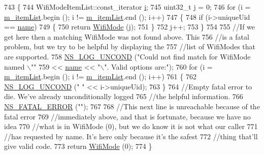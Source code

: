 \begin{DoxyCode}
743 \{
744   WifiModeItemList::const\_iterator \hyperlink{bernuolliDistribution_8m_a6f6ccfcf58b31cb6412107d9d5281426}{i};
745   uint32\_t j = 0;
746   \textcolor{keywordflow}{for} (i = \hyperlink{classns3_1_1WifiModeFactory_aa8fc74e45dbb82fc08d4d5eb967266e6}{m\_itemList}.begin (); i != \hyperlink{classns3_1_1WifiModeFactory_aa8fc74e45dbb82fc08d4d5eb967266e6}{m\_itemList}.end (); i++)
747     \{
748       \textcolor{keywordflow}{if} (i->uniqueUid == \hyperlink{generate__test__data__lte__spectrum__model_8m_ab74e6bf80237ddc4109968cedc58c151}{name})
749         \{
750           \textcolor{keywordflow}{return} \hyperlink{classns3_1_1WifiModeFactory_af4f7ddea2391d3900ddb643f3bfeeefd}{WifiMode} (j);
751         \}
752       j++;
753     \}
754 
755   \textcolor{comment}{//If we get here then a matching WifiMode was not found above. This}
756   \textcolor{comment}{//is a fatal problem, but we try to be helpful by displaying the}
757   \textcolor{comment}{//list of WifiModes that are supported.}
758   \hyperlink{log-macros-disabled_8h_a0b36e5e182b37194f85ef1c5e979fb2e}{NS\_LOG\_UNCOND} (\textcolor{stringliteral}{"Could not find match for WifiMode named \(\backslash\)""}
759                  << \hyperlink{generate__test__data__lte__spectrum__model_8m_ab74e6bf80237ddc4109968cedc58c151}{name} << \textcolor{stringliteral}{"\(\backslash\)". Valid options are:"});
760   \textcolor{keywordflow}{for} (i = \hyperlink{classns3_1_1WifiModeFactory_aa8fc74e45dbb82fc08d4d5eb967266e6}{m\_itemList}.begin (); i != \hyperlink{classns3_1_1WifiModeFactory_aa8fc74e45dbb82fc08d4d5eb967266e6}{m\_itemList}.end (); i++)
761     \{
762       \hyperlink{log-macros-disabled_8h_a0b36e5e182b37194f85ef1c5e979fb2e}{NS\_LOG\_UNCOND} (\textcolor{stringliteral}{"  "} << i->uniqueUid);
763     \}
764   \textcolor{comment}{//Empty fatal error to die. We've already unconditionally logged}
765   \textcolor{comment}{//the helpful information.}
766   \hyperlink{group__fatal_ga5131d5e3f75d7d4cbfd706ac456fdc85}{NS\_FATAL\_ERROR} (\textcolor{stringliteral}{""});
767 
768   \textcolor{comment}{//This next line is unreachable because of the fatal error}
769   \textcolor{comment}{//immediately above, and that is fortunate, because we have no idea}
770   \textcolor{comment}{//what is in WifiMode (0), but we do know it is not what our caller}
771   \textcolor{comment}{//has requested by name. It's here only because it's the safest}
772   \textcolor{comment}{//thing that'll give valid code.}
773   \textcolor{keywordflow}{return} \hyperlink{classns3_1_1WifiModeFactory_af4f7ddea2391d3900ddb643f3bfeeefd}{WifiMode} (0);
774 \}
\end{DoxyCode}


